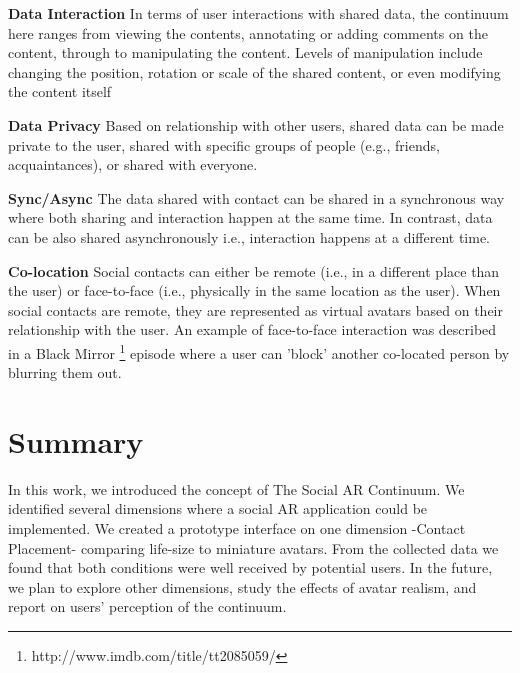\textbf{Data Interaction}
In terms of user interactions with shared data, the continuum here ranges from viewing the contents, annotating or adding comments on the content, through to manipulating the content. Levels of manipulation include changing the position, rotation or scale of the shared content, or even modifying the content itself

\textbf{Data Privacy}
Based on relationship with other users, shared data can be made private to the user, shared with specific groups of people (e.g., friends, acquaintances), or shared with everyone. 

\textbf{Sync/Async}
The data shared with contact can be shared in a synchronous way where both sharing and interaction happen at the same time. In contrast, data can be also shared asynchronously \cite{Smith2016} i.e., interaction happens at a different time. 

\textbf{Co-location}
Social contacts can either be remote (i.e., in a different place than the user) or face-to-face (i.e., physically in the same location as the user). When social contacts are remote, they are represented as virtual avatars based on their relationship with the user. An example of face-to-face interaction was described in a Black Mirror \footnote{http://www.imdb.com/title/tt2085059/} episode where a user can 'block' another co-located person by blurring them out. 

\section{Summary}

In this work, we introduced the concept of The Social AR Continuum. We identified several dimensions where a social AR application could be implemented. We created a prototype interface on one dimension -Contact Placement- comparing life-size to miniature avatars. From the collected data we found that both conditions were well received by potential users. In the future, we plan to explore other dimensions, study the effects of avatar realism, and report on users' perception of the continuum.
